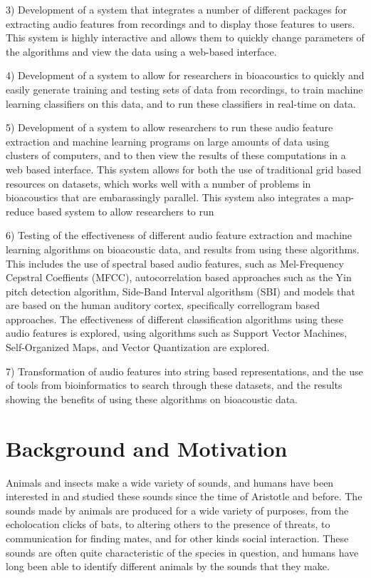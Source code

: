 3) Development of a system that integrates a number of different
packages for extracting audio features from recordings and to display
those features to users.  This system is highly interactive and allows
them to quickly change parameters of the algorithms and view the data
using a web-based interface.

4) Development of a system to allow for researchers in bioacoustics to
quickly and easily generate training and testing sets of data from
recordings, to train machine learning classifiers on this data, and to
run these classifiers in real-time on data.

5) Development of a system to allow researchers to run these audio
feature extraction and machine learning programs on large amounts of
data using clusters of computers, and to then view the results of
these computations in a web based interface.  This system allows for
both the use of traditional grid based resources on datasets, which
works well with a number of problems in bioacoustics that are
embarassingly parallel.  This system also integrates a map-reduce
based system to allow researchers to run

6) Testing of the effectiveness of different audio feature extraction
and machine learning algorithms on bioacoustic data, and results from
using these algorithms.  This includes the use of spectral based audio
features, such as Mel-Frequency Cepstral Coeffients (MFCC),
autocorrelation based approaches such as the Yin pitch detection
algorithm, Side-Band Interval algorithsm (SBI) and models that are
based on the human auditory cortex, specifically correllogram based
approaches.  The effectiveness of different classification algorithms
using these audio features is explored, using algorithms such as
Support Vector Machines, Self-Organized Maps, and Vector Quantization
are explored.

7) Transformation of audio features into string based representations,
and the use of tools from bioinformatics to search through these
datasets, and the results showing the benefits of using these
algorithms on bioacoustic data.


\section{Background and Motivation}

Animals and insects make a wide variety of sounds, and humans have
been interested in and studied these sounds since the time of
Aristotle \cite{aristotle} and before.  The sounds made by animals are
produced for a wide variety of purposes, from the echolocation clicks
of bats, to altering others to the presence of threats, to
communication for finding mates, and for other kinds social
interaction.  These sounds are often quite characteristic of the
species in question, and humans have long been able to identify
different animals by the sounds that they make.  

